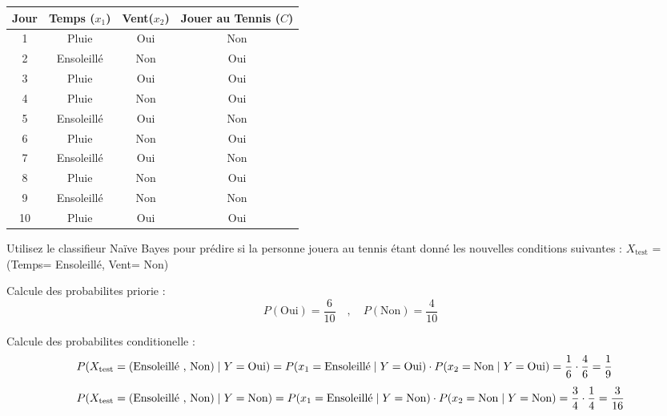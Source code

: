 \documentclass{article}
\begin{document}
\begin{table}[h]
\centering

\renewcommand{\arraystretch}{2.25} 
\setlength{\tabcolsep}{12pt}      

\begin{tabular}{|c|c|c|c|} 

\hline

Jour & Temps ($x_1$) & Vent($x_2$) & Jouer au Tennis ($C$) \\ \hline
1 & Pluie & Oui & Non \\ \hline
2 & Ensoleillé & Non & Oui \\ \hline
3 & Pluie & Oui & Oui \\ \hline
4 & Pluie & Non & Oui \\ \hline
5 & Ensoleillé & Oui & Non \\ \hline
6 & Pluie & Non & Oui \\ \hline
7 & Ensoleillé & Oui & Non \\ \hline
8 & Pluie & Non & Oui \\ \hline
9 & Ensoleillé & Non & Non \\ \hline
10 & Pluie & Oui & Oui \\ \hline
\end{tabular}
\end{table}

Utilisez le classifieur Naïve Bayes pour prédire si la personne jouera au tennis étant donné
les nouvelles conditions suivantes : $X_{\text{test}}$ = (Temps= Ensoleillé, Vent= Non) 

\vspace{0.75cm}
Calcule des probabilites priorie :
\[P(\text{Oui}) = \dfrac{6}{10} \quad , \quad P(\text{Non}) = \dfrac{4}{10}\]


\vspace{0.75cm}
Calcule des probabilites conditionelle :
\begin{align*}
    &P(X_{\text{test}} = (\text{Ensoleillé , Non}) \hspace{0.1cm} | \hspace{0.1cm} Y = \text{Oui}) = P(x_1 = \text{Ensoleillé} \hspace{0.1cm} | \hspace{0.1cm} Y =\text{Oui}) \cdot P(x_2 = \text{Non} \hspace{0.1cm} | \hspace{0.1cm} Y =\text{Oui}) = \dfrac{1}{6} \cdot \dfrac{4}{6} = \dfrac{1}{9}\\[0.15cm] 
    &P(X_{\text{test}} = (\text{Ensoleillé , Non}) \hspace{0.1cm} | \hspace{0.1cm} Y = \text{Non}) = P(x_1 = \text{Ensoleillé} \hspace{0.1cm} | \hspace{0.1cm} Y =\text{Non}) \cdot P(x_2 = \text{Non} \hspace{0.1cm} | \hspace{0.1cm} Y =\text{Non}) = \dfrac{3}{4} \cdot \dfrac{1}{4} = \dfrac{3}{16} 
\end{align*}
\end{document}
